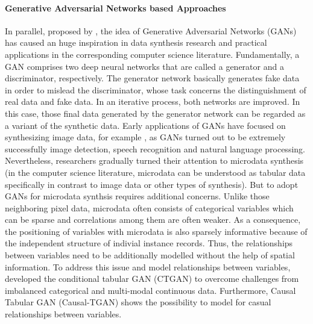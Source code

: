 \paragraph{Generative Adversarial Networks based Approaches}
In parallel, proposed by \citet{goodfellow2020generative}, the idea of Generative Adversarial Networks (GANs) has caused an huge inspiration
in data synthesis research and practical applications in the corresponding computer science literature. Fundamentally, a GAN comprises two deep 
neural networks that are called a generator and a discriminator, respectively. The generator network basically generates fake data in order to
mislead the discriminator, whose task concerns the distinguishment of real data and fake data. In an iterative process, both networks
are improved. In this case, those final data generated by the generator network can be regarded as a variant of the synthetic data.
Early applications of GANs have focused on synthesizing image data, for example \citep{denton2015deep}, as GANs turned out to be extremely
successfully image detection, speech recognition and natural language processing. Nevertheless, researchers gradually turned their attention to
microdata synthesis (in the computer science literature, microdata can be understood as tabular data specifically in contrast to image data or other types of synthesis). 
But to adopt GANs for microdata synthsis requires additional concerns. Unlike those neighboring pixel data, microdata often consists of categorical variables
which can be sparse and correlations among them are often weaker. As a consequence, the positioning of variables with microdata is also
sparsely informative because of the independent structure of indivial instance records. Thus, the relationships between variables need to be 
additionally modelled without the help of spatial information. To address this issue and model relationships between variables, 
\citet*{xu2019modeling} developed the conditional tabular GAN (CTGAN) to overcome challenges from imbalanced categorical and multi-modal continuous data.
Furthermore, Causal Tabular GAN (Causal-TGAN) \citep{wen2021causal} shows the possibility to model for casual relationships between variables.

